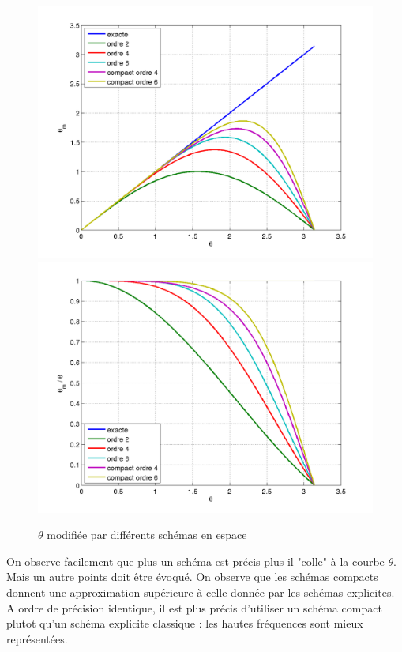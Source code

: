 \documentclass[10pt,a4paper]{amsart}
\begin{document}
\begin{figure}[h!]
\includegraphics[scale=0.4]{onde_modifiee.png}
\includegraphics[scale=0.4]{coef_onde_modifiee.png}
\caption{$\theta$ modifiée par différents schémas en espace}
\label{LOM}
\end{figure}

On observe facilement que plus un schéma est précis plus il "colle" à la courbe $\theta$. Mais un autre points doit être évoqué. On observe que les schémas compacts donnent une approximation supérieure à celle donnée par les schémas explicites. A ordre de précision identique, il est plus précis d'utiliser un schéma compact plutot qu'un schéma explicite classique : les hautes fréquences sont mieux représentées.
\end{document}
